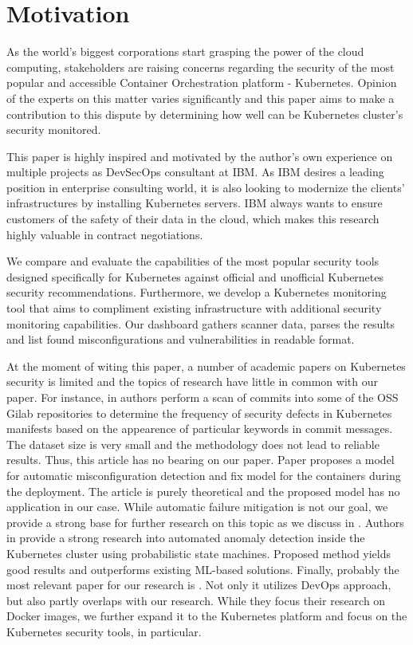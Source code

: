 \chapter*{Motivation}

As the world's biggest corporations start grasping the power of the cloud computing, stakeholders are raising concerns regarding the security of the most popular and accessible Container Orchestration platform - Kubernetes. Opinion of the experts on this matter varies significantly and this paper aims to make a contribution to this dispute by determining how well can be Kubernetes cluster's security monitored.

This paper is highly inspired and motivated by the author's own experience on multiple projects as DevSecOps consultant at IBM. As IBM desires a leading position in enterprise consulting world, it is also looking to modernize the clients' infrastructures by installing Kubernetes servers. IBM always wants to ensure customers of the safety of their data in the cloud, which makes this research highly valuable in contract negotiations.

We compare and evaluate the capabilities of the most popular security tools designed specifically for Kubernetes against official and unofficial Kubernetes security recommendations. Furthermore, we develop a Kubernetes monitoring tool that aims to compliment existing infrastructure with additional security monitoring capabilities. Our dashboard gathers scanner data, parses the results and list found misconfigurations and vulnerabilities in readable format.

At the moment of witing this paper, a number of academic papers on Kubernetes security is limited and the topics of research have little in common with our paper. For instance, in \cite{defects} authors perform a scan of commits into some of the OSS Gilab repositories to determine the frequency of security defects in Kubernetes manifests based on the appearence of particular keywords in commit messages. The dataset size is very small and the methodology does not lead to reliable results. Thus, this article has no bearing on our paper. Paper \cite{detection} proposes a model for automatic misconfiguration detection and fix model for the containers during the deployment. The article is purely theoretical and the proposed model has no application in our case. While automatic failure mitigation is not our goal, we provide a strong base for further research on this topic as we discuss in . Authors in \cite{machines} provide a strong research into automated anomaly detection inside the Kubernetes cluster using probabilistic state machines. Proposed method yields good results and outperforms existing ML-based solutions. Finally, probably the most relevant paper for our research is \cite{evaluation}. Not only it utilizes DevOps approach, but also partly overlaps with our research. While they focus their research on Docker images, we further expand it to the Kubernetes platform and focus on the Kubernetes security tools, in particular.
